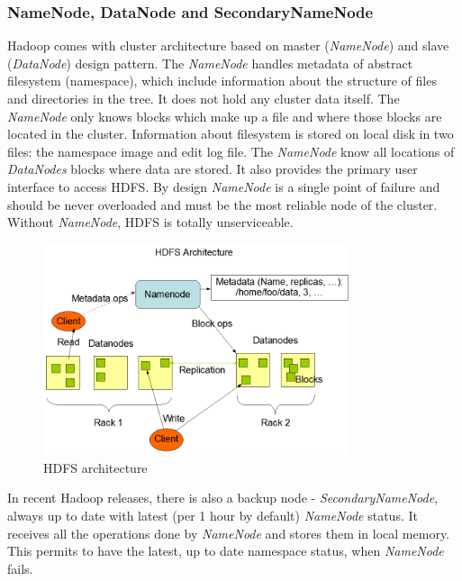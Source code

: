 \documentclass[a4paper,12pt,oneside]{report}
\begin{document}
	\subsubsection{NameNode, DataNode and SecondaryNameNode}
	Hadoop comes with cluster architecture based on master (\textit{NameNode}) and
	slave (\textit{DataNode}) design pattern. 
	The \textit{NameNode} handles metadata of abstract filesystem (namespace), which
	include
	information about the structure of files and directories in the tree.  It does
	not hold any cluster data itself. 
	The  \textit{NameNode} only knows blocks which make up a file and where those
	blocks are located in the cluster.
	Information about filesystem is stored on local disk in two files: the namespace
	image and edit log file. 
	The \textit{NameNode} know all locations of  \textit{DataNodes} blocks where
	data 
	are stored. It also provides the primary user interface to access HDFS. 
	By design \textit{NameNode}  is a single point of failure and should be never
	overloaded and must 
	be the most reliable node of the cluster.  Without \textit{NameNode}, HDFS is
	totally unserviceable. 
	\begin{figure}[!htbp]
		\centering
		\includegraphics[width=0.8\textwidth]{./img/hdfsarchitecture.png}
		\caption[HDFS architecture1]{\centering HDFS architecture \footnotemark}
		\label{hdfs_arch}
	\end{figure} 
	In recent Hadoop releases, there is also a backup node -
	\textit{SecondaryNameNode}, always up to date 
	with latest (per 1 hour by default) \textit{NameNode} status. It receives all the
	operations done by \textit{NameNode} and 
	stores them in local memory. This permits to have the latest, up to date
	namespace status, when \textit{NameNode} fails. 
	
\end{document}
